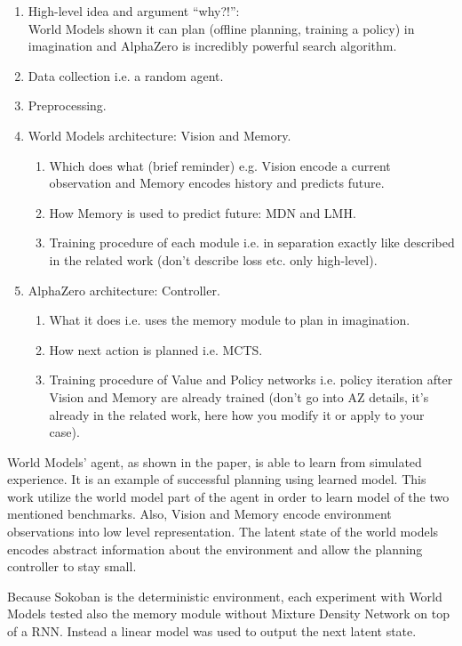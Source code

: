 \begin{enumerate}
\item High-level idea and argument ``why?!'':\\
  World Models shown it can plan (offline planning, training a policy) in imagination and AlphaZero is incredibly powerful search algorithm.
\item Data collection i.e. a random agent.
\item Preprocessing.
\item World Models architecture: Vision and Memory.
  \begin{enumerate}
  \item Which does what (brief reminder) e.g. Vision encode a current observation and Memory encodes history and predicts future.
  \item How Memory is used to predict future: MDN and LMH.
  \item Training procedure of each module i.e. in separation exactly like described in the related work (don't describe loss etc. only high-level).
  \end{enumerate}
\item AlphaZero architecture: Controller.
  \begin{enumerate}
  \item What it does i.e. uses the memory module to plan in imagination.
  \item How next action is planned i.e. MCTS.
  \item Training procedure of Value and Policy networks i.e. policy iteration after Vision and Memory are already trained (don't go into AZ details, it's already in the related work, here how you modify it or apply to your case).
  \end{enumerate}
\end{enumerate}

World Models' agent, as shown in the paper\cite{Algo.WorldModels}, is able to learn from simulated experience. It is an example of successful planning using learned model. This work utilize the world model part of the agent in order to learn model of the two mentioned benchmarks. Also, Vision and Memory encode environment observations into low level representation. The latent state of the world models encodes abstract information about the environment and allow the planning controller to stay small.

Because Sokoban is the deterministic environment, each experiment with World Models tested also the memory module without Mixture Density Network on top of a RNN. Instead a linear model was used to output the next latent state.

